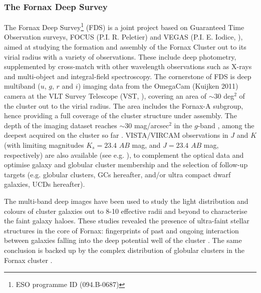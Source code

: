 \documentclass[usenatbib]{mnras}
\begin{document}
\subsubsection{The Fornax Deep Survey}
\label{sec:FDS}

The Fornax Deep Survey\footnote{ESO programme ID (094.B-0687)} (FDS) is a joint 
project based on Guaranteed Time Observation surveys, FOCUS (P.I. R. Peletier) 
and VEGAS (P.I. E. Iodice, \citealt{capaccioli15}), aimed at studying the 
formation and assembly of the Fornax Cluster out to its virial radius with a 
variety of observations. These include
deep photometry, supplemented by cross-match with other wavelength observations 
such as  X-rays \citep[][e.g.,]{Paolillo02} and multi-object and integral-field 
spectroscopy.
The cornerstone of FDS is deep multiband ($u$, $g$, $r$ and $i$) imaging data 
from the OmegaCam (Kuijken 2011) camera at the VLT Survey Telescope (VST, 
\citealt{schipani12}), covering an area of $\sim30$ deg$^2$ of the cluster out 
to the virial radius. The area includes the Fornax-A subgroup, hence providing 
a full coverage of the cluster structure under assembly.  The depth of the 
imaging dataset reaches $\sim 30$ mag/arcsec$^2$ in the $g$-band \citep{Iodice16, Iodice17}, 
among the deepest acquired on the cluster so far \citep{venhola17}. 
VISTA/VIRCAM observations in $J$ and $K$ (with limiting magnitudes $K_s  = 23.4 $ $AB$ 
mag, and $J = 23.4$ $AB$ mag, respectively) are also available (see e.g. \citealt{munoz15}), to 
complement the optical data and optimise galaxy and globular cluster membership 
and the selection of follow-up targets (e.g. globular clusters, GCs hereafter, 
and/or ultra compact dwarf galaxies, UCDs hereafter). 

The multi-band deep images have been used to study the light distribution and 
colours of cluster galaxies out to 8-10 effective radii and beyond to 
characterise the faint galaxy haloes. These studies revealed the presence of 
ultra-faint stellar structures in the core of Fornax: fingerprints of past and 
ongoing interaction between galaxies falling into the deep potential well of 
the cluster \citep{Iodice16,venhola17}. The same conclusion is 
backed up by the complex distribution of globular clusters in the Fornax 
cluster \citep{DAbrusco16,cantiello17}.
\end{document}
